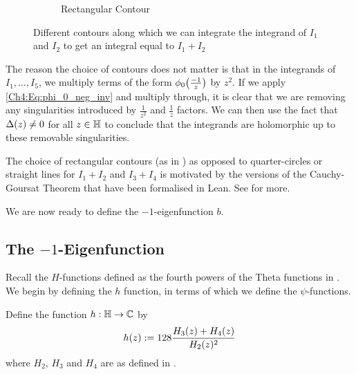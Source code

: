 \begin{figure}[ht]
\begin{subfigure}{0.3\textwidth}
        \label{Ch4:subfig:a_rect_contour}
        \caption{Rectangular Contour}
    \end{subfigure}
    \caption{\centering Different contours along which we can integrate the integrand of $I_1$ and $I_2$ to get an integral equal to $I_1 + I_2$}
    \label{Ch4:fig:a_contours}
\end{figure}

The reason the choice of contours does not matter is that in the integrands of $I_1, \ldots, I_5$, we multiply terms of the form $\phi_0\!\left( \frac{-1}{z} \right)$ by $z^2$. If we apply \eqref{Ch4:Eq:phi_0_neg_inv} and multiply through, it is clear that we are removing any singularities introduced by $\frac{1}{z^2}$ and $\frac{1}{z}$ factors. We can then use the fact that $\Delta\!\left( z \right) \neq 0$ for all $z \in \mathbb{H}$ to conclude that the integrands are holomorphic up to these removable singularities.

The choice of rectangular contours (as in ) as opposed to quarter-circles or straight lines for $I_1 + I_2$ and $I_3 + I_4$ is motivated by the versions of the Cauchy-Goursat Theorem that have been formalised in Lean. See  for more.


We are now ready to define the $-1$-eigenfunction $b$.

\subsection{The $-1$-Eigenfunction}

Recall the $H$-functions defined as the fourth powers of the Theta functions in . We begin by defining the $h$ function, in terms of which we define the $\psi$-functions.

\begin{boxdefinition}\label{Ch4:Def:h}
    Define the function $h : \mathbb{H} \to \mathbb{C}$ by
    \begin{align}
        h\!\left( z \right) := 128 \frac{H_3(z) + H_4(z)}{H_2(z)^2} \label{Ch4:Eq:h_def}
    \end{align}
    where $H_2$, $H_3$ and $H_4$ are as defined in .
\end{boxdefinition}

